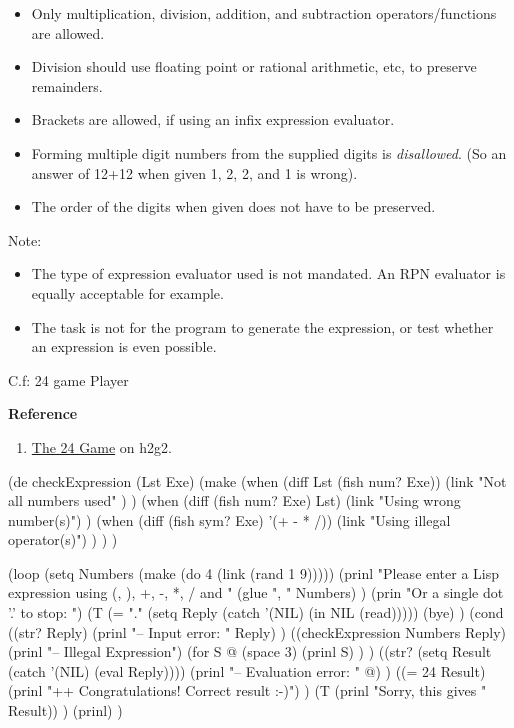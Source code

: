 \begin{itemize}
\item
  Only multiplication, division, addition, and subtraction
  operators/functions are allowed.
\item
  Division should use floating point or rational arithmetic, etc, to
  preserve remainders.
\item
  Brackets are allowed, if using an infix expression evaluator.
\item
  Forming multiple digit numbers from the supplied digits is
  \emph{disallowed}. (So an answer of 12+12 when given 1, 2, 2, and 1 is
  wrong).
\item
  The order of the digits when given does not have to be preserved.
\end{itemize}

Note:

\begin{itemize}
\item The type of expression evaluator used is not mandated. An RPN
  evaluator is equally acceptable for example.
\item
  The task is not for the program to generate the expression, or test
  whether an expression is even possible.
\end{itemize}

C.f: 24 game Player

\textbf{Reference}

\begin{enumerate}
\item
  \href{http://www.bbc.co.uk/dna/h2g2/A933121}{The 24 Game} on h2g2.
\end{enumerate}


\begin{wideverbatim}

(de checkExpression (Lst Exe)
   (make
      (when (diff Lst (fish num? Exe))
         (link "Not all numbers used" ) )
      (when (diff (fish num? Exe) Lst)
         (link "Using wrong number(s)") )
      (when (diff (fish sym? Exe) '(+ - * /))
         (link "Using illegal operator(s)") ) ) )

(loop
   (setq Numbers (make (do 4 (link (rand 1 9)))))
   (prinl
      "Please enter a Lisp expression using (, ), +, -, *, / and "
      (glue ", " Numbers) )
   (prin "Or a single dot '.' to stop: ")
   (T (= "." (setq Reply (catch '(NIL) (in NIL (read)))))
      (bye) )
   (cond
      ((str? Reply)
         (prinl "-- Input error: " Reply) )
      ((checkExpression Numbers Reply)
         (prinl "-- Illegal Expression")
         (for S @
            (space 3)
            (prinl S) ) )
      ((str? (setq Result (catch '(NIL) (eval Reply))))
         (prinl "-- Evaluation error: " @) )
      ((= 24 Result)
         (prinl "++ Congratulations! Correct result :-)") )
      (T (prinl "Sorry, this gives " Result)) )
   (prinl) )

\end{wideverbatim}


